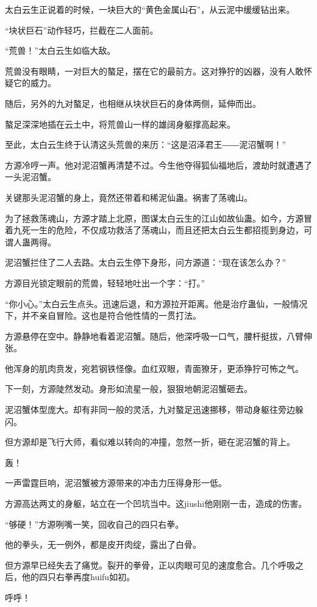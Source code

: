 \begin{this_body}
太白云生正说着的时候，一块巨大的“黄色金属山石”，从云泥中缓缓钻出来。

“块状巨石”动作轻巧，拦截在二人面前。

“荒兽！”太白云生如临大敌。

荒兽没有眼睛，一对巨大的螯足，摆在它的最前方。这对狰狞的凶器，没有人敢怀疑它的威力。

随后，另外的九对螯足，也相继从块状巨石的身体两侧，延伸而出。

螯足深深地插在云土中，将荒兽山一样的雄阔身躯撑高起来。

至此，太白云生终于认清这头荒兽的来历：“这是沼泽君王――泥沼蟹啊！”

方源冷哼一声。他对泥沼蟹再清楚不过。今生他夺得狐仙福地后，渡劫时就遭遇了一头泥沼蟹。

关键那头泥沼蟹的身上，竟然还带着和稀泥仙蛊。祸害了荡魂山。

为了拯救荡魂山，方源才踏上北原，图谋太白云生的江山如故仙蛊。如今，方源冒着九死一生的危险，不仅成功救活了荡魂山，而且还把太白云生都招揽到身边，可谓人蛊两得。

泥沼蟹拦住了二人去路。太白云生停下身形，问方源道：“现在该怎么办？”

方源目光锁定眼前的荒兽，轻轻地吐出一个字：“打。”

“你小心。”太白云生点头。迅速后退，和方源拉开距离。他是治疗蛊仙，一般情况下，并不亲自冒险。这也是符合他性情的一贯打法。

方源悬停在空中。静静地看着泥沼蟹。随后，他深呼吸一口气，腰杆挺拔，八臂伸张。

他浑身的肌肉贲发，宛若钢铁怪像。血红双眼，青面獠牙，更添狰狞可怖之气。

下一刻，方源陡然发动。身形如流星一般，狠狠地朝泥沼蟹砸去。

泥沼蟹体型庞大。却有非同一般的灵活，九对螯足迅速挪移，带动身躯往旁边躲闪。

但方源却是飞行大师，看似难以转向的冲撞，忽然一折，砸在泥沼蟹的背上。

轰！

一声雷霆巨响，泥沼蟹被方源带来的冲击力压得身形一低。

方源高达两丈的身躯，站立在一个凹坑当中。这jiushi他刚刚一击，造成的伤害。

“够硬！”方源咧嘴一笑，回收自己的四只右拳。

他的拳头，无一例外，都是皮开肉绽，露出了白骨。

但方源早已经失去了痛觉。裂开的拳骨，正以肉眼可见的速度愈合。几个呼吸之后，他的四只右拳再度huifu如初。

呼呼！


\end{this_body}
